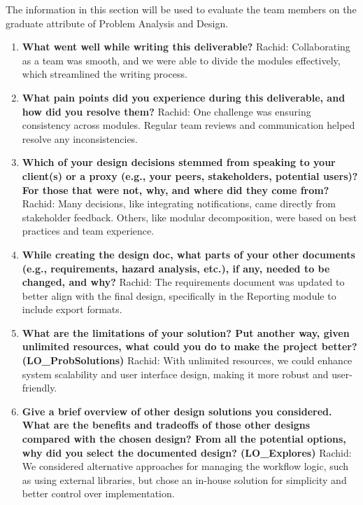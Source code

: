\documentclass[12pt, titlepage]{article}
\begin{document}
The information in this section will be used to evaluate the team members on the
graduate attribute of Problem Analysis and Design.



\begin{enumerate}
  \item \textbf{What went well while writing this deliverable?}  
  \newline
  Rachid: Collaborating as a team was smooth, and we were able to divide the modules effectively, which streamlined the writing process.

  \item \textbf{What pain points did you experience during this deliverable, and how did you resolve them?}  
  \newline
  Rachid: One challenge was ensuring consistency across modules. Regular team reviews and communication helped resolve any inconsistencies.

  \item \textbf{Which of your design decisions stemmed from speaking to your client(s) or a proxy (e.g., your peers, stakeholders, potential users)? For those that were not, why, and where did they come from?}  
  \newline
  Rachid: Many decisions, like integrating notifications, came directly from stakeholder feedback. Others, like modular decomposition, were based on best practices and team experience.

  \item \textbf{While creating the design doc, what parts of your other documents (e.g., requirements, hazard analysis, etc.), if any, needed to be changed, and why?}  
  \newline
  Rachid: The requirements document was updated to better align with the final design, specifically in the Reporting module to include export formats.

  \item \textbf{What are the limitations of your solution? Put another way, given unlimited resources, what could you do to make the project better? (LO\_ProbSolutions)}  
  \newline
  Rachid: With unlimited resources, we could enhance system scalability and user interface design, making it more robust and user-friendly.

  \item \textbf{Give a brief overview of other design solutions you considered. What are the benefits and tradeoffs of those other designs compared with the chosen design? From all the potential options, why did you select the documented design? (LO\_Explores)}  
  \newline
  Rachid: We considered alternative approaches for managing the workflow logic, such as using external libraries, but chose an in-house solution for simplicity and better control over implementation.
\end{enumerate}
\end{document}
